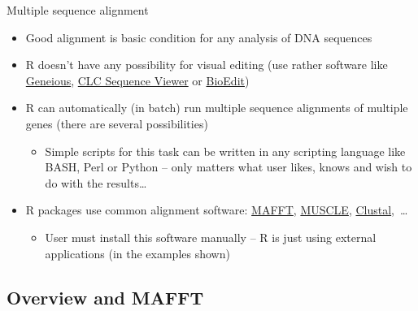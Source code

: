 \documentclass[compress, ucs, xelatex, 11pt, xcolor=svgnames,
  hyperref={
    bookmarks=true,
    unicode=true,
    colorlinks=true,
    pdftitle={Molecular data in R},
    plainpages=false,
    pdfauthor={Vojtech Zeisek},
    pdfsubject={Course about phylogeny and evolution in R},
    pdfcreator={XeLaTeX},
    pdfkeywords={R, evolution, phylogeny, molecular data},
    linkcolor=Tomato,
    anchorcolor=SaddleBrown,
    citecolor=Goldenrod,
    filecolor=DarkMagenta,
    menucolor=Sienna,
    urlcolor=DarkTurquoise,
    pdftex},
  url={hyphens, lowtilde} %
  ]{beamer}
\begin{document}
\begin{frame}{Multiple sequence alignment}
  \begin{itemize}
    \item Good alignment is basic condition for any analysis of DNA sequences
    \item R doesn't have any possibility for visual editing (use rather software like \href{http://www.geneious.com/}{Geneious}, \href{http://www.clcbio.com/products/clc-sequence-viewer/}{CLC Sequence Viewer} or \href{http://www.mbio.ncsu.edu/bioedit/bioedit.html}{BioEdit})
    \item R can automatically (in batch) run multiple sequence alignments of multiple genes (there are several possibilities)
    \begin{itemize}
      \item Simple scripts for this task can be written in any scripting language like BASH, Perl or Python -- only matters what user likes, knows and wish to do with the results\ldots
    \end{itemize}
    \item R packages use common alignment software: \href{http://mafft.cbrc.jp/alignment/software/}{MAFFT}, \href{http://www.drive5.com/muscle/}{MUSCLE}, \href{http://www.clustal.org/}{Clustal},~\ldots
    \begin{itemize}
      \item User must install this software manually -- R is just using external applications (in the examples shown)
    \end{itemize}
  \end{itemize}
\end{frame}

\subsection{Overview and MAFFT}
\end{document}
